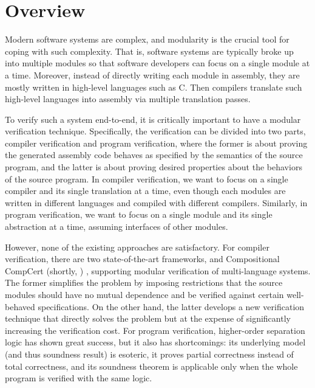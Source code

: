 \chapter{\;\;\;\;Overview}\label{sec:overview}


Modern software systems are complex, and modularity is the crucial tool for coping with such complexity.
That is, software systems are typically broke up into multiple modules so that software developers can focus on a single module at a time.
Moreover, instead of directly writing each module in assembly, they are mostly written in high-level languages such as C.
Then compilers translate such high-level languages into assembly via multiple translation passes.




To verify such a system end-to-end, it is critically important to have a modular verification technique.
Specifically, the verification can be divided into two parts, compiler verification and program verification,
where the former is about proving the generated assembly code behaves as specified by the semantics of the source program,
and the latter is about proving desired properties about the behaviors of the source program.
In compiler verification, we want to focus on a single compiler and its single translation at a time, even though each modules are written in different languages and compiled with different compilers.
Similarly, in program verification, we want to focus on a single module and its single abstraction at a time, assuming interfaces of other modules.




However, none of the existing approaches are satisfactory.
For compiler verification, there are two state-of-the-art frameworks, \ccx{} \cite{gu:dscal,wang:saccx} and Compositional CompCert (shortly, \ccc{}) \cite{beringer:isem,stewart:ccc},
supporting modular verification of multi-language systems. %
The former simplifies the problem by
imposing restrictions that the source modules should have no mutual
dependence and be verified against certain well-behaved
specifications. On the other hand, the latter develops a new
verification technique that directly solves the problem but at the
expense of significantly increasing the verification cost.
For program verification, higher-order separation logic has shown great success, but it also has shortcomings:
its underlying model (and thus soundness result) is esoteric, it proves partial correctness instead of total correctness,
and its soundness theorem is applicable only when the whole program is verified with the same logic.








